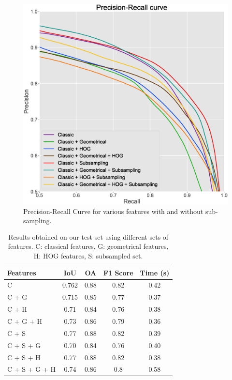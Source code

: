 \documentclass[10pt,twocolumn,letterpaper]{article}
\begin{document}
\begin{figure}
    \centering
    \includegraphics[width=\linewidth]{ROC.eps}
    \caption{Precision-Recall Curve for various features with and without sub-sampling.}
    \label{fig:roc}
\end{figure}
    
\begin{table}
\centering
\begin{tabular}{|l|c|c|c|c|} %
  \hline
  \textbf{Features} & \textbf{IoU} & \textbf{OA} & \textbf{F1 Score} & \textbf{Time (s)}\\
  \hline
  C             &  0.762 &  0.88 & 0.82 & 0.42 \\
  C + G         & 0.715 & 0.85 & 0.77 & 0.37 \\
  C + H         & 0.71 & 0.84 & 0.76 & 0.38 \\
  C + G + H     & 0.73 & 0.86 & 0.79 & 0.36 \\
  C + S         & 0.77 & 0.88 & 0.82 & 0.39 \\
  C + S + G     & 0.70 & 0.84 & 0.76 & 0.40 \\
  C + S + H     & 0.77 & 0.88 & 0.82 & 0.38\\
  C + S + G + H & 0.74 & 0.86 & 0.8 & 0.58 \\
  \hline
\end{tabular}
\caption{Results obtained on our test set using different sets of features. C: classical features, G: geometrical features, H: HOG features, S: subsampled set.}\label{tab:results}
\end{table}  
    
\end{document}
